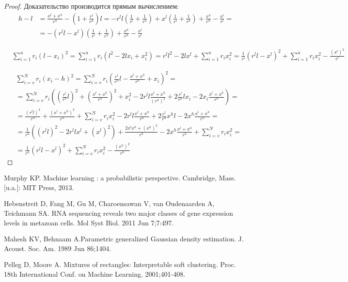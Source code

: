 \documentclass[12pt]{article}
\theoremstyle{definition}
\theoremstyle{plain}
\begin{document}
\begin{proof}

Доказательство производится прямым вычислением:
\begin{align*}
h - l &= \frac{x^l + x^h}{r^h} - \left(1 + \frac{r^l}{r^h}\right) l =
-r^l l \left(\frac{1}{r^l} + \frac{1}{r^h}\right) + 
x^l \left(\frac{1}{r^l} + \frac{1}{r^h}\right) +
\frac{x^h}{r^h} - \frac{x^l}{r^l} = \\
&= - \left(r^l l - x^l \right) \left(\frac{1}{r^l} + \frac{1}{r^h}\right) +
\frac{x^h}{r^h} - \frac{x^l}{r^l}
\end{align*}

\begin{align*}
& \sum_{i = 1}^u r_i (l - x_i)^2 =
\sum_{i = 1}^u r_i \left(l^2 - 2 l x_i + x_i^2 \right) = 
r^l l^2 - 2l x^l + \sum_{i = 1}^u r_i x_i^2
= \frac{1}{r^l} \left(r^l l - x^l \right)^2
+ \sum_{i = 1}^u r_i x_i^2 - \frac{(x^l)^2}{r^l}
\end{align*}

\begin{align*}
& \sum_{i = v}^N r_i (x_i - h)^2 =
\sum_{i = v}^N r_i \left(
\frac{r^l}{r^h} l - \frac{x^l + x^h}{r^h} + x_i
\right)^2 = \\
&= \sum_{i = v}^N r_i \left(
\left( \frac{r^l}{r^h} l \right)^2 +
\left( \frac{x^l + x^h}{r^h} \right)^2 +
 x_i^2 
-2 r^l l \frac{x^l + x^h}{(r^h)^2}
+2 \frac{r^l}{r^h} l x_i
-2 x_i \frac{x^l + x^h}{r^h}
\right) = \\
&= \frac{(r^l l)^2}{r^h} +
\frac{(x^l + x^h)^2}{r^h} +
\sum_{i = v}^N r_i x_i^2
-2 r^l l \frac{x^l + x^h}{r^h}
+2 \frac{r^l}{r^h} x^h l 
-2 x^h \frac{x^l + x^h}{r^h} = \\
&= \frac{1}{r^h} \left( (r^l l)^2 - 2 r^l l x^l + (x^l)^2 \right) +
\frac{2 x^l x^h + (x^h)^2}{r^h}
-2 x^h \frac{x^l + x^h}{r^h} +
\sum_{i = v}^N r_i x_i^2 = \\
&= \frac{1}{r^h} \left(r^l l - x^l \right)^2
+ \sum_{i = v}^N r_i x_i^2 - \frac{(x^h)^2}{r^h}
\end{align*}

\end{proof}

\begin{thebibliography}{99}
 Murphy KP. Machine learning : a probabilistic perspective. 
Cambridge, Mass. [u.a.]: MIT Press, 2013. 

 Hebenstreit D, Fang M, Gu M, Charoensawan V, van Oudenaarden A, Teichmann SA. RNA sequencing reveals two major classes of gene expression levels in metazoan cells. Mol Syst Biol. 2011 Jun 7;7:497.

 Mahesh KV, Behnaam A.Parametric generalized Gaussian density estimation. J. Acoust. Soc. Am. 1989 Jun 86;1404.

 Pelleg D, Moore A. Mixtures of rectangles: Interpretable soft clustering. Proc. 18th International Conf. on Machine Learning. 2001;401-408.

\end{thebibliography}
\end{document}
